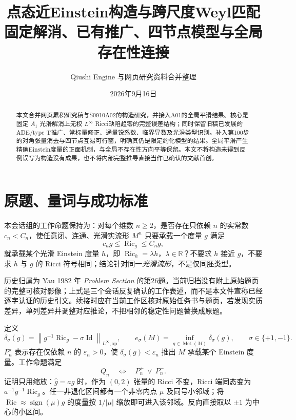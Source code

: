 \documentclass[UTF8,a4paper,11pt,fontset=fandol]{ctexart}
\title{点态近Einstein构造与跨尺度Weyl匹配\\[0.5em]{\large 固定解消、已有推广、四节点模型与全局存在性连接}}
\author{Qiushi Engine 与网页研究资料\quad 合并整理}
\date{2026年9月16日}
\numberwithin{equation}{section}
\theoremstyle{definition}
\newcommand{\Ric}{\operatorname{Ric}}
\newcommand{\Met}{\operatorname{Met}}
\newcommand{\Id}{\operatorname{Id}}
\newcommand{\op}{\mathrm{op}}
\newcommand{\R}{\mathbb R}
\newcommand{\norm}[1]{\left\lVert#1\right\rVert}
\begin{document}
\maketitle
\begin{abstract}
本文合并网页累积研究稿与S0910A02的构造研究，并接入A01的全局平滑结果。核心是固定 $A_1$ 光滑解消上无权 $L^\infty$ Ricci缺陷趋零的完整误差结构；同时保留旧稿已发展的ADE/type T推广、常标量修正、通量锐系数、临界导数及光滑类型识别。补入第100步的对角张量消去与四节点互易可行窗，明确其仍是限定约化模型的结果。全局平滑产生精确Einstein度量的正面机制，与全局不存在性方向平等保留。本文不将构造未得到反例误写为构造没有成果，也不将内部完整推导直接当作已确认的文献首创。
\end{abstract}
\begingroup
\small\linespread{1.0}\selectfont\setlength{\parskip}{0pt}
\tableofcontents
\endgroup
\clearpage

\section{原题、量词与成功标准}
本会话组的工作命题保持为：对每个维数 $n\ge2$，是否存在只依赖 $n$ 的实常数 $c_n<C_n$，使任意闭、连通、光滑实流形 $M^n$ 只要承载一个度量 $g$ 满足
\begin{equation}\label{eq:Q}
 c_ng\le\Ric_g\le C_ng,
\end{equation}
就承载某个光滑 Einstein 度量 $h$，即 $\Ric_h=\lambda h$，$\lambda\in\R$？不要求 $h$ 接近 $g$，不要求 $h$ 与 $g$ 的 Ricci 符号相同；结论针对同一\emph{光滑流形}，不是仅同胚类型。

历史归属为 Yau 1982 年 \emph{Problem Section} 的第26题\cite{Yau1982}。当前归档没有附上原始题页的完整可核对影像；上式是三个会话反复确认的工作表述，而不是本文件宣称已经逐字认证的历史引文。续接时应在当前工作区核对原始任务书与题页，若发现实质差异，单列差异并调整对应推论，不把相邻的稳定性问题替换成原题。

定义
\begin{equation}\label{eq:defect}
 \delta_\sigma(g)=\norm{g^{-1}\Ric_g-\sigma\Id}_{L^\infty,\op},\qquad
 e_\sigma(M)=\inf_{g\in\Met(M)}\delta_\sigma(g),\qquad \sigma\in\{+1,-1\}.
\end{equation}
$P_n^\sigma$ 表示存在仅依赖 $n$ 的 $\varepsilon_n>0$，使 $\delta_\sigma(g)<\varepsilon_n$ 推出 $M$ 承载某个 Einstein 度量。工作命题满足
\begin{equation}\label{eq:branches}
 Q_n\quad\Longleftrightarrow\quad P_n^+\ \lor\ P_n^-.
\end{equation}
证明只用缩放：$\widehat g=ag$ 时，作为 $(0,2)$ 张量的 Ricci 不变，Ricci 端同态变为 $a^{-1}g^{-1}\Ric_g$。任一非退化区间都有一个非零内点 $\mu$ 及同号小邻域；将 $\Ric\approx\operatorname{sign}(\mu)g$ 的度量按 $1/|\mu|$ 缩放即可进入该邻域。反向直接取以 $\pm1$ 为中心的小区间。
\end{document}
